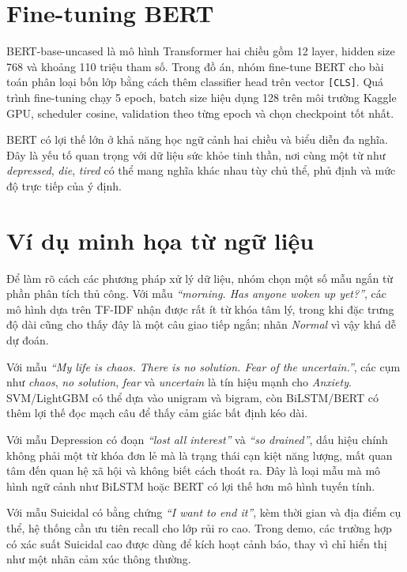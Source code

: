 \documentclass[12pt,a4paper,oneside]{report}
\newlength{\manualparindent}
\newcommand{\manualindent}{\hspace*{\manualparindent}}
\begin{document}
\section{Fine-tuning BERT}

\manualindent%
BERT-base-uncased là mô hình Transformer hai chiều gồm 12 layer, hidden size 768 và khoảng 110 triệu tham số. Trong đồ án, nhóm fine-tune BERT cho bài toán phân loại bốn lớp bằng cách thêm classifier head trên vector \texttt{[CLS]}. Quá trình fine-tuning chạy 5 epoch, batch size hiệu dụng 128 trên môi trường Kaggle GPU, scheduler cosine, validation theo từng epoch và chọn checkpoint tốt nhất.

\manualindent%
BERT có lợi thế lớn ở khả năng học ngữ cảnh hai chiều và biểu diễn đa nghĩa. Đây là yếu tố quan trọng với dữ liệu sức khỏe tinh thần, nơi cùng một từ như \textit{depressed}, \textit{die}, \textit{tired} có thể mang nghĩa khác nhau tùy chủ thể, phủ định và mức độ trực tiếp của ý định.

\section{Ví dụ minh họa từ ngữ liệu}

\manualindent%
Để làm rõ cách các phương pháp xử lý dữ liệu, nhóm chọn một số mẫu ngắn từ phần phân tích thủ công. Với mẫu \textit{``morning. Has anyone woken up yet?''}, các mô hình dựa trên TF-IDF nhận được rất ít từ khóa tâm lý, trong khi đặc trưng độ dài cũng cho thấy đây là một câu giao tiếp ngắn; nhãn \textit{Normal} vì vậy khá dễ dự đoán.

\manualindent%
Với mẫu \textit{``My life is chaos. There is no solution. Fear of the uncertain.''}, các cụm như \textit{chaos}, \textit{no solution}, \textit{fear} và \textit{uncertain} là tín hiệu mạnh cho \textit{Anxiety}. SVM/LightGBM có thể dựa vào unigram và bigram, còn BiLSTM/BERT có thêm lợi thế đọc mạch câu để thấy cảm giác bất định kéo dài.

\manualindent%
Với mẫu Depression có đoạn \textit{``lost all interest''} và \textit{``so drained''}, dấu hiệu chính không phải một từ khóa đơn lẻ mà là trạng thái cạn kiệt năng lượng, mất quan tâm đến quan hệ xã hội và không biết cách thoát ra. Đây là loại mẫu mà mô hình ngữ cảnh như BiLSTM hoặc BERT có lợi thế hơn mô hình tuyến tính.

\manualindent%
Với mẫu Suicidal có bằng chứng \textit{``I want to end it''}, kèm thời gian và địa điểm cụ thể, hệ thống cần ưu tiên recall cho lớp rủi ro cao. Trong demo, các trường hợp có xác suất Suicidal cao được dùng để kích hoạt cảnh báo, thay vì chỉ hiển thị như một nhãn cảm xúc thông thường.
\end{document}
